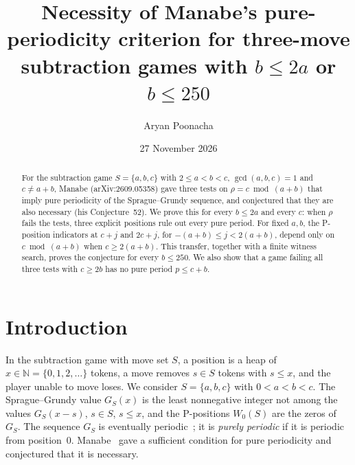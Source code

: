 \documentclass[11pt]{amsart}
\title[Manabe's criterion for $b\le 2a$ and for $b\le 250$]{Necessity of Manabe's pure-periodicity criterion for three-move subtraction games with $b\le 2a$ or $b\le 250$}
\author{Aryan Poonacha}
\date{27 November 2026}
\theoremstyle{definition}
\numberwithin{equation}{section}
\newcommand{\N}{\mathbb{N}}
\begin{document}
\begin{abstract}
For the subtraction game $S=\{a,b,c\}$ with $2\le a<b<c$, $\gcd(a,b,c)=1$ and
$c\ne a+b$, Manabe (arXiv:2609.05358) gave three tests on $\rho=c\bmod(a+b)$ that imply
pure periodicity of the Sprague--Grundy sequence, and conjectured that they are also
necessary (his Conjecture~52). We prove this for every $b\le 2a$ and every $c$: when $\rho$
fails the tests, three explicit positions rule out every pure period. For fixed $a,b$, the
P-position indicators at $c+j$ and $2c+j$, for $-(a+b)\le j<2(a+b)$, depend only on
$c\bmod(a+b)$ when $c\ge2(a+b)$. This transfer, together with a finite witness search,
proves the conjecture for every $b\le250$. We also show that a game failing all three tests
with $c\ge 2b$ has no pure period $p\le c+b$.
\end{abstract}

\maketitle

\section{Introduction}

In the subtraction game with move set $S$, a position is a heap of $x\in\N=\{0,1,2,\dots\}$
tokens, a move removes $s\in S$ tokens with $s\le x$, and the player unable to move loses.
We consider $S=\{a,b,c\}$ with $0<a<b<c$. The Sprague--Grundy value $G_S(x)$ is the least
nonnegative integer not among the values $G_S(x-s)$, $s\in S$, $s\le x$, and the
P-positions $W_0(S)$ are the zeros of $G_S$. The sequence $G_S$ is eventually
periodic~\cite{Golomb}; it is \emph{purely periodic} if it is periodic from position~$0$.
Manabe~\cite{Manabe} gave a sufficient condition for pure periodicity and conjectured that
it is necessary.
\end{document}
